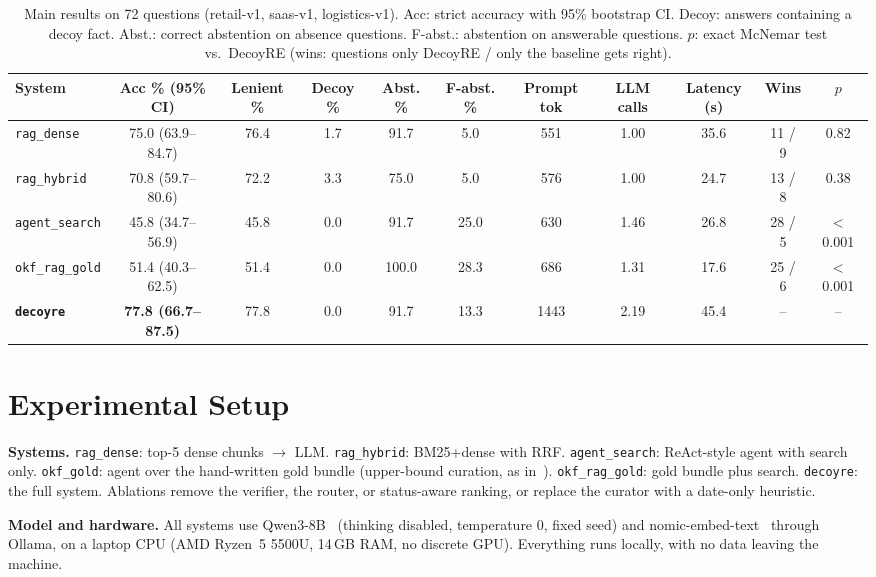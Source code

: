 \documentclass[conference]{IEEEtran}
\newcommand{\sys}[1]{\texttt{#1}}
\begin{document}
\begin{table}[t]
\caption{Main results on 72 questions (retail-v1, saas-v1, logistics-v1). Acc: strict accuracy with 95\% bootstrap CI.
Decoy: answers containing a decoy fact. Abst.: correct abstention on absence questions. F-abst.: abstention on answerable
questions. $p$: exact McNemar test vs.\ DecoyRE (wins: questions only DecoyRE / only the baseline gets right).}
\label{tab:main}
\centering
\small
\setlength{\tabcolsep}{3.6pt}
\begin{tabular}{@{}lcccccccccc@{}}
\toprule
System & Acc \% (95\% CI) & Lenient \% & Decoy \% & Abst. \% & F-abst. \% & Prompt tok & LLM calls & Latency (s) & Wins & $p$ \\
\midrule
\sys{rag\_dense}    & 75.0 (63.9--84.7) & 76.4 & 1.7 & 91.7 & 5.0  & 551  & 1.00 & 35.6 & 11 / 9  & 0.82 \\
\sys{rag\_hybrid}   & 70.8 (59.7--80.6) & 72.2 & 3.3 & 75.0 & 5.0  & 576  & 1.00 & 24.7 & 13 / 8  & 0.38 \\
\sys{agent\_search} & 45.8 (34.7--56.9) & 45.8 & 0.0 & 91.7 & 25.0 & 630  & 1.46 & 26.8 & 28 / 5  & $<$0.001 \\
\sys{okf\_rag\_gold}& 51.4 (40.3--62.5) & 51.4 & 0.0 & 100.0& 28.3 & 686  & 1.31 & 17.6 & 25 / 6  & $<$0.001 \\
\textbf{\sys{decoyre}} & \textbf{77.8 (66.7--87.5)} & 77.8 & 0.0 & 91.7 & 13.3 & 1443 & 2.19 & 45.4 & -- & -- \\
\bottomrule
\end{tabular}
\end{table}

\section{Experimental Setup}

\textbf{Systems.} \sys{rag\_dense}: top-5 dense chunks $\rightarrow$ LLM. \sys{rag\_hybrid}: BM25+dense with RRF.
\sys{agent\_search}: ReAct-style agent with search only. \sys{okf\_gold}: agent over the hand-written gold bundle
(upper-bound curation, as in~\cite{ruiz2026okf}). \sys{okf\_rag\_gold}: gold bundle plus search.
\sys{decoyre}: the full system. Ablations remove the verifier, the router, or status-aware ranking, or replace the
curator with a date-only heuristic.

\textbf{Model and hardware.} All systems use Qwen3-8B~\cite{qwen3} (thinking disabled, temperature 0, fixed seed)
and nomic-embed-text~\cite{nussbaum2024nomic} through Ollama, on a laptop CPU (AMD Ryzen~5 5500U, 14\,GB RAM, no
discrete GPU). Everything runs locally, with no data leaving the machine.
\end{document}
